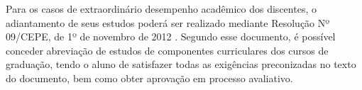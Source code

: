 Para os casos de extraordinário desempenho acadêmico dos discentes, o adiantamento de seus estudos poderá ser realizado mediante Resolução Nº 09/CEPE, de 1º de novembro de 2012 \cite{ufc_resolucao_09_cepe_2012}. Segundo esse documento, é possível conceder abreviação de estudos de componentes curriculares dos cursos de graduação, tendo o aluno de satisfazer todas as exigências preconizadas no texto do documento, bem como obter aprovação em processo avaliativo.